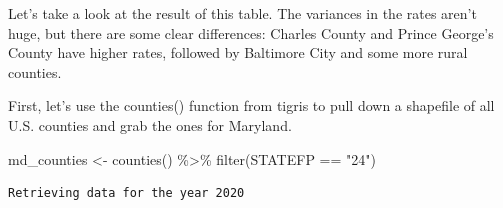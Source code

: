 \documentclass[
  letterpaper,
  DIV=11,
  numbers=noendperiod]{scrreprt}
\newenvironment{Shaded}{\begin{snugshade}}{\end{snugshade}}
\newcommand{\FunctionTok}[1]{\textcolor[rgb]{0.28,0.35,0.67}{#1}}
\newcommand{\NormalTok}[1]{\textcolor[rgb]{0.00,0.23,0.31}{#1}}
\newcommand{\OtherTok}[1]{\textcolor[rgb]{0.00,0.23,0.31}{#1}}
\newcommand{\SpecialCharTok}[1]{\textcolor[rgb]{0.37,0.37,0.37}{#1}}
\newcommand{\StringTok}[1]{\textcolor[rgb]{0.13,0.47,0.30}{#1}}
\begin{document}
Let's take a look at the result of this table. The variances in the
rates aren't huge, but there are some clear differences: Charles County
and Prince George's County have higher rates, followed by Baltimore City
and some more rural counties.

First, let's use the counties() function from tigris to pull down a
shapefile of all U.S. counties and grab the ones for Maryland.

\begin{Shaded}
\begin{Highlighting}[]
\NormalTok{md\_counties }\OtherTok{\textless{}{-}} \FunctionTok{counties}\NormalTok{() }\SpecialCharTok{\%\textgreater{}\%}
  \FunctionTok{filter}\NormalTok{(STATEFP }\SpecialCharTok{==} \StringTok{"24"}\NormalTok{)}
\end{Highlighting}
\end{Shaded}

\begin{verbatim}
Retrieving data for the year 2020
\end{verbatim}
\end{document}

